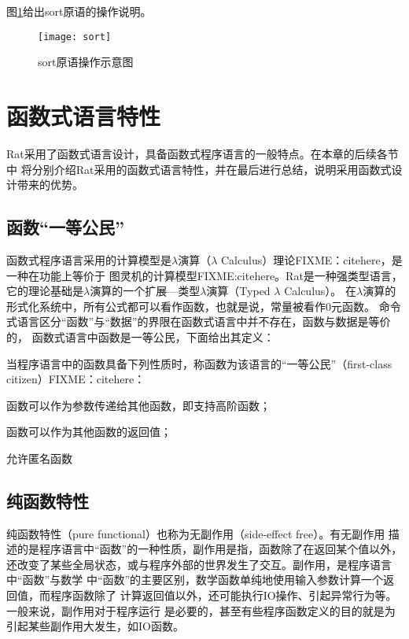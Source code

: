 图\ref{fig:sort-diagram}给出sort原语的操作说明。
\begin{figure}[h]
  \centering
  \texttt{[image: sort]}
  \caption{sort原语操作示意图}
  \label{fig:sort-diagram}
\end{figure}


\section{函数式语言特性}\label{sec:functional-characters}
Rat采用了函数式语言设计，具备函数式程序语言的一般特点。在本章的后续各节中
将分别介绍Rat采用的函数式语言特性，并在最后进行总结，说明采用函数式设计带来的优势。

\subsection{函数“一等公民”}
函数式程序语言采用的计算模型是$\lambda$演算（$\lambda$ Calculus）理论FIXME：citehere，是一种在功能上等价于
图灵机的计算模型FIXME:citehere。Rat是一种强类型语言，
它的理论基础是$\lambda$演算的一个扩展---类型$\lambda$演算（Typed $\lambda$ Calculus）。
在$\lambda$演算的形式化系统中，所有公式都可以看作函数，也就是说，常量被看作0元函数。
命令式语言区分“函数”与“数据”的界限在函数式语言中并不存在，函数与数据是等价的，
函数式语言中函数是一等公民，下面给出其定义：

\begin{definition}
  当程序语言中的函数具备下列性质时，称函数为该语言的“一等公民”（first-class citizen）FIXME：citehere：
  \begin{compactitem}
    \item 函数可以作为参数传递给其他函数，即支持高阶函数；
    \item 函数可以作为其他函数的返回值；
    \item 允许匿名函数
  \end{compactitem}
\end{definition}


\subsection{纯函数特性}
纯函数特性（pure functional）也称为无副作用（side-effect free）。有无副作用
描述的是程序语言中“函数”的一种性质，副作用是指，函数除了在返回某个值以外，
还改变了某些全局状态，或与程序外部的世界发生了交互。副作用，是程序语言中“函数”与数学
中“函数”的主要区别，数学函数单纯地使用输入参数计算一个返回值，而程序函数除了
计算返回值以外，还可能执行IO操作、引起异常行为等。一般来说，副作用对于程序运行
是必要的，甚至有些程序函数定义的目的就是为引起某些副作用大发生，如IO函数。


